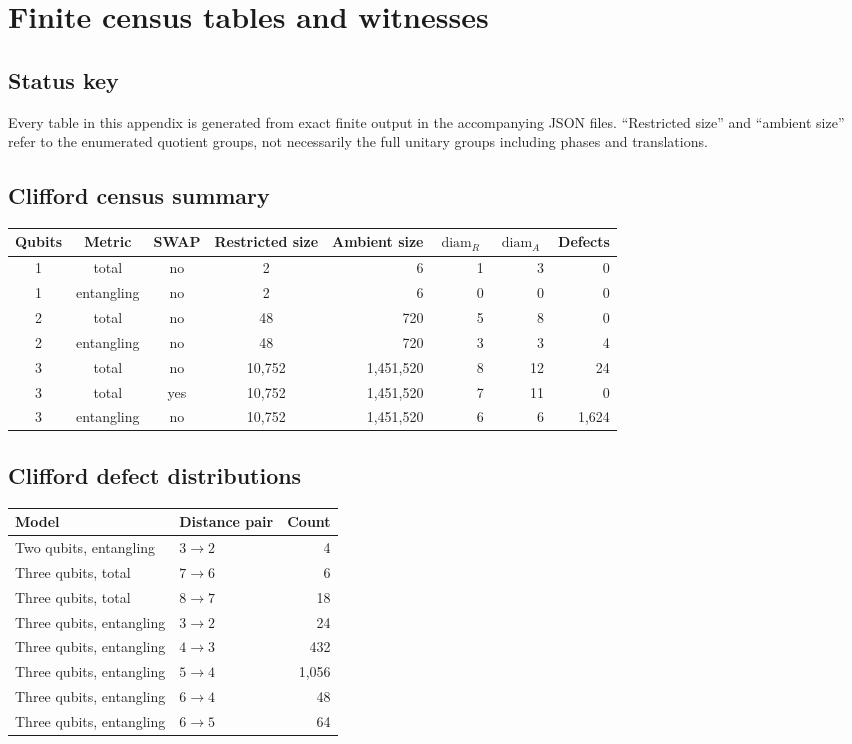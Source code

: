 \chapter{Finite census tables and witnesses}\label{app:census}


\section{Status key}
Every table in this appendix is generated from exact finite output in the accompanying JSON files.  ``Restricted size'' and ``ambient size'' refer to the enumerated quotient groups, not necessarily the full unitary groups including phases and translations.

\section{Clifford census summary}
\begin{longtable}{@{}ccccrrrr@{}}
\toprule
Qubits & Metric & SWAP & Restricted size & Ambient size & $\operatorname{diam}_R$ & $\operatorname{diam}_A$ & Defects\\
\midrule
1 & total & no & 2 & 6 & 1 & 3 & 0\\
1 & entangling & no & 2 & 6 & 0 & 0 & 0\\
2 & total & no & 48 & 720 & 5 & 8 & 0\\
2 & entangling & no & 48 & 720 & 3 & 3 & 4\\
3 & total & no & 10,752 & 1,451,520 & 8 & 12 & 24\\
3 & total & yes & 10,752 & 1,451,520 & 7 & 11 & 0\\
3 & entangling & no & 10,752 & 1,451,520 & 6 & 6 & 1,624\\
\bottomrule
\end{longtable}

\section{Clifford defect distributions}
\begin{longtable}{@{}p{}p{}r@{}}
\toprule
Model & Distance pair & Count\\
\midrule
Two qubits, entangling & $3\to2$ & 4\\
Three qubits, total & $7\to6$ & 6\\
Three qubits, total & $8\to7$ & 18\\
Three qubits, entangling & $3\to2$ & 24\\
Three qubits, entangling & $4\to3$ & 432\\
Three qubits, entangling & $5\to4$ & 1,056\\
Three qubits, entangling & $6\to4$ & 48\\
Three qubits, entangling & $6\to5$ & 64\\
\bottomrule
\end{longtable}

